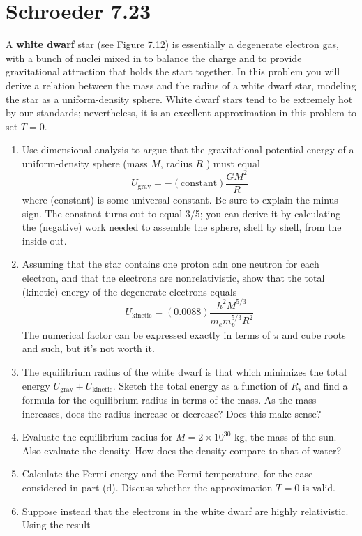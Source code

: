 \documentclass[10pt]{article}
\begin{document}
	\section*{Schroeder 7.23}
	A \textbf{white dwarf} star (see Figure 7.12) is essentially a degenerate electron gas, with a bunch of 
	nuclei mixed in to balance the charge and to provide gravitational attraction that holds the start 
	together. In this problem you will derive a relation between the mass and the radius of a white dwarf 
	star, modeling the star as a uniform-density sphere. White dwarf stars tend to be extremely hot by our 
	standards; nevertheless, it is an excellent approximation in this problem to set \( T = 0 \).
	\begin{enumerate}[label=\alph*)]
		\item Use dimensional analysis to argue that the gravitational potential energy of a uniform-density 
			sphere (mass \( M \), radius \( R \) ) must equal 
			\[
				U_{\text{grav}} = -(\text{constant}) \frac{GM^2}{R}
			\] 
			where (constant) is some universal constant. Be sure to explain the minus sign. The constnat 
			turns out to equal 3/5; you can derive it by calculating the (negative) work needed to 
			assemble the sphere, shell by shell, from the inside out.
		\item Assuming that the star contains one proton adn one neutron for each electron, and that the 
			electrons are nonrelativistic, show that the total (kinetic) energy of the 
			degenerate electrons equals 
			\[
				U_{\text{kinetic}} = (0.0088) \frac{h^2 M^{5 / 3}}{m_e m_p^{5 / 3}R^2}
			\] 
			The numerical factor can be expressed exactly in terms of \( \pi \) and cube roots 
			and such, but it's not worth it.
		\item The equilibrium radius of the white dwarf is that which minimizes the total energy 
			\( U_{\text{grav}} + U_\text{kinetic} \). Sketch the total energy as a function of \( R \), 
			and find a formula for the equilibrium radius in terms of the mass. As the mass increases, does 
			the radius increase or decrease? Does this make sense?
		\item Evaluate the equilibrium radius for \( M = 2 \times 10^{30} \) kg, the mass of the sun. Also 
			evaluate the density. How does the density compare to that of water?
		\item Calculate the Fermi energy and the Fermi temperature, for the case considered in part (d). Discuss
			whether the approximation \( T = 0 \) is valid. 
		\item Suppose instead that the electrons in the white dwarf are highly relativistic. Using the result 

\end{enumerate}
\end{document}

